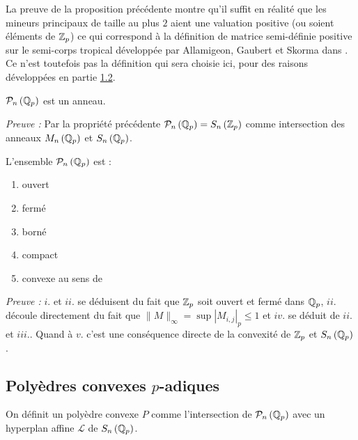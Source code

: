 \hfill \qedsymbol
\begin{remarque}
	
	La preuve de la proposition précédente montre qu'il suffit en réalité que les mineurs principaux de taille au plus $2$ aient une valuation positive (ou soient éléments de $ \mathbb {Z}_p $) ce qui correspond à la définition de matrice semi-définie positive sur le semi-corps tropical développée par Allamigeon, Gaubert et Skorma dans \cite{allamigeon_tropical_2020} . Ce n'est toutefois pas la définition qui sera choisie ici, pour des raisons développées en partie \hyperlink{subsection.1.2}{1.2}.
\end{remarque}

\begin{propriete}
	$\mathcal{P}_n \left( \mathbb{Q}_p \right)$ est un anneau.
\end{propriete}

\textit{Preuve :} Par la propriété précédente $\mathcal{P}_n \left( \mathbb{Q}_p \right) = S_n \left(  \mathbb {Z}_p  \right)$ comme intersection des anneaux $M_n \left( \mathbb{Q}_p \right)$ et $S_n\left( \mathbb{Q}_p \right) $.
\begin{propriete}
	L'ensemble $\mathcal{P}_n \left( \mathbb{Q}_p \right)$ est :
	\begin{enumerate}[label=\roman*.]
	\item ouvert
	\item fermé
	\item borné
	\item compact
	\item convexe au sens de \parencite{monna_ensembles_1958}
\end{enumerate}
\end{propriete}
\textit{Preuve :}
$i.$ et $ii.$ se déduisent du fait que $ \mathbb {Z}_p $ soit ouvert et fermé dans $\mathbb{Q}_p$, $ii.$ découle directement du fait que $\|M\|_\infty = \sup |M_{i,j}|_p \le 1$ et $iv.$ se déduit de $ii.$ et $iii.$.
Quand à $v.$ c'est une conséquence directe de la convexité de $ \mathbb {Z}_p $ et $S_n\left( \mathbb{Q}_p \right) $.


\subsection{Polyèdres convexes \texorpdfstring{$p$}{p}-adiques} 


\begin{definition}
	
On définit un polyèdre convexe $P$ comme l'intersection de $\mathcal{P}_n \left( \mathbb{Q}_p \right)$ avec un hyperplan affine $\mathcal{L} $ de $S_n\left( \mathbb{Q}_p \right) $. 
\end{definition}

